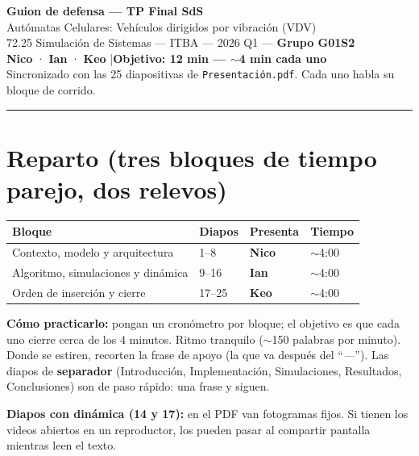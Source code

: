 \documentclass[11pt,a4paper]{article}
\begin{document}
\begin{center}
  {\LARGE\textbf{Guion de defensa --- TP Final SdS}}\\[4pt]
  {\large Autómatas Celulares: Vehículos dirigidos por vibración (VDV)}\\[6pt]
  72.25 Simulación de Sistemas --- ITBA --- 2026 Q1 --- \textbf{Grupo G01S2}\\[4pt]
  \textcolor{cnico}{\textbf{Nico}} \; · \; \textcolor{cian}{\textbf{Ian}} \; · \; \textcolor{ckeo}{\textbf{Keo}}
  \hspace{1.5em}|\hspace{1.5em}\textbf{Objetivo: 12 min --- $\sim$4 min cada uno}\\[2pt]
  {\small Sincronizado con las 25 diapositivas de \texttt{Presentación.pdf}. Cada uno habla su bloque de corrido.}
\end{center}

\vspace{2pt}
\hrule
\vspace{6pt}

\section*{Reparto (tres bloques de tiempo parejo, dos relevos)}

\begin{center}
\begin{tabular}{llll}
\toprule
\textbf{Bloque} & \textbf{Diapos} & \textbf{Presenta} & \textbf{Tiempo} \\
\midrule
Contexto, modelo y arquitectura & 1--8 & \textcolor{cnico}{\textbf{Nico}} & $\sim$4:00 \\
Algoritmo, simulaciones y dinámica & 9--16 & \textcolor{cian}{\textbf{Ian}} & $\sim$4:00 \\
Orden de inserción y cierre & 17--25 & \textcolor{ckeo}{\textbf{Keo}} & $\sim$4:00 \\
\bottomrule
\end{tabular}
\end{center}

\textbf{Cómo practicarlo:} pongan un cronómetro por bloque; el objetivo es que cada uno cierre cerca de
los 4 minutos. Ritmo tranquilo ($\sim$150 palabras por minuto). Donde se estiren, recorten la frase de
apoyo (la que va después del ``\emph{---}''). Las diapos de \textbf{separador} (Introducción,
Implementación, Simulaciones, Resultados, Conclusiones) son de paso rápido: una frase y siguen.

\textbf{Diapos con dinámica (14 y 17):} en el PDF van fotogramas fijos. Si tienen los videos abiertos en
un reproductor, los pueden pasar al compartir pantalla mientras leen el texto.
\end{document}
